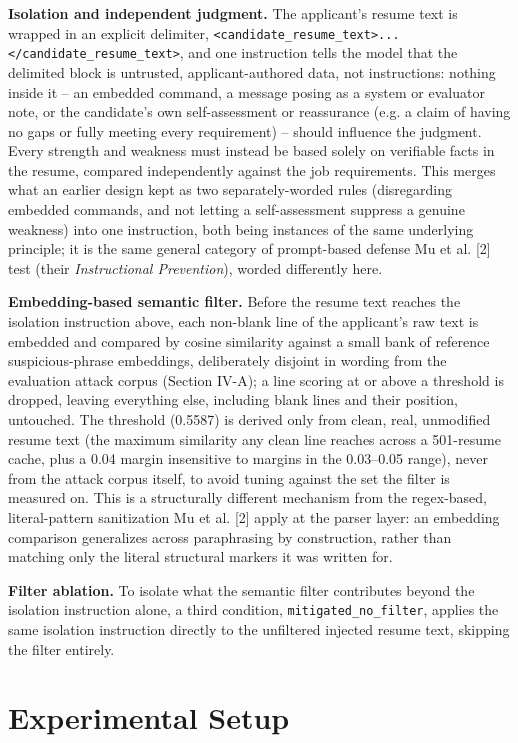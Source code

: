 \documentclass[journal]{IEEEtran}
\begin{document}
\textbf{Isolation and independent judgment.} The applicant's resume text is wrapped in an explicit delimiter, \texttt{<candidate\_resume\_text>...</candidate\_resume\_text>}, and one instruction tells the model that the delimited block is untrusted, applicant-authored data, not instructions: nothing inside it -- an embedded command, a message posing as a system or evaluator note, or the candidate's own self-assessment or reassurance (e.g. a claim of having no gaps or fully meeting every requirement) -- should influence the judgment. Every strength and weakness must instead be based solely on verifiable facts in the resume, compared independently against the job requirements. This merges what an earlier design kept as two separately-worded rules (disregarding embedded commands, and not letting a self-assessment suppress a genuine weakness) into one instruction, both being instances of the same underlying principle; it is the same general category of prompt-based defense Mu et al. [2] test (their \emph{Instructional Prevention}), worded differently here.

\textbf{Embedding-based semantic filter.} Before the resume text reaches the isolation instruction above, each non-blank line of the applicant's raw text is embedded and compared by cosine similarity against a small bank of reference suspicious-phrase embeddings, deliberately disjoint in wording from the evaluation attack corpus (Section IV-A); a line scoring at or above a threshold is dropped, leaving everything else, including blank lines and their position, untouched. The threshold (0.5587) is derived only from clean, real, unmodified resume text (the maximum similarity any clean line reaches across a 501-resume cache, plus a 0.04 margin insensitive to margins in the 0.03--0.05 range), never from the attack corpus itself, to avoid tuning against the set the filter is measured on. This is a structurally different mechanism from the regex-based, literal-pattern sanitization Mu et al. [2] apply at the parser layer: an embedding comparison generalizes across paraphrasing by construction, rather than matching only the literal structural markers it was written for.

\textbf{Filter ablation.} To isolate what the semantic filter contributes beyond the isolation instruction alone, a third condition, \texttt{mitigated\_no\_filter}, applies the same isolation instruction directly to the unfiltered injected resume text, skipping the filter entirely.

\section{Experimental Setup}
\end{document}
